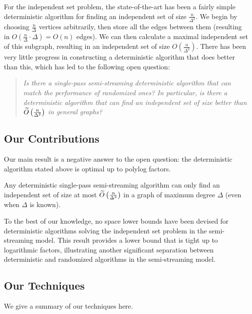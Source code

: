 \documentclass[11pt]{article}
\begin{document}
For the independent set problem, the state-of-the-art has been a fairly simple deterministic algorithm for finding an independent set of size $\frac n{\Delta^2}$. We begin by choosing $\frac n{\Delta}$ vertices arbitrarily, then store all the edges between them (resulting in $O\left(\frac n{\Delta}\cdot \Delta\right)=O(n)$ edges). We can then calculate a maximal independent set of this subgraph, resulting in an independent set of size $O\left(\frac n{\Delta^2}\right)$. There has been very little progress in constructing a deterministic algorithm that does better than this, which has led to the following open question:
\vspace{-0.3cm}
\begin{quote}
    \begin{center}
        \textit{Is there a single-pass semi-streaming deterministic algorithm that can match the performance of randomized ones? In particular, is there a deterministic algorithm that can find an independent set of size better than $\widetilde{O}\left(\frac n{\Delta^2}\right)$ in general graphs?}
    \end{center}
\end{quote}

\subsection{Our Contributions}

Our main result is a negative answer to the open question: the deterministic algorithm stated above is optimal up to polylog factors.

\begin{result}\label{main-result}

Any deterministic single-pass semi-streaming algorithm can only find an independent set of size at most $\widetilde{O}\left(\frac n{\Delta^2}\right)$ in a graph of maximum degree $\Delta$ (even when $\Delta$ is known). 
\end{result}

To the best of our knowledge, no space lower bounds have been devised for deterministic algorithms solving the independent set problem in the semi-streaming model. This result provides a lower bound that is tight up to logarithmic factors, illustrating another significant separation between deterministic and randomized algorithms in the semi-streaming model. 

\subsection{Our Techniques}\label{sec:our-technique}
We give a summary of our techniques here.
\end{document}
